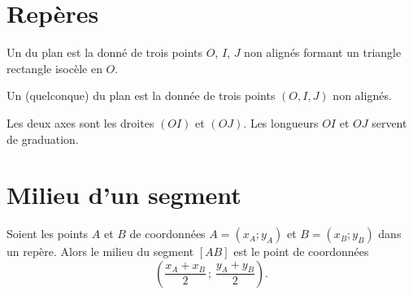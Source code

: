 

\section{Repères}

\begin{definition}
    Un  du plan est la donné de trois points \( O\), \( I\), \( J\) non alignés formant un triangle rectangle isocèle en  \( O\).
\end{definition}

\begin{definition}
    Un  (quelconque) du plan est la donnée de trois points \( (O,I,J)\) non alignés.

    Les deux axes sont les droites \( (OI)\) et \( (OJ)\). Les longueurs \( OI\) et \( OJ\) servent de graduation.
\end{definition}

\section{Milieu d'un segment}

\begin{Aretenir}
    Soient les points \( A\) et \( B\) de coordonnées \( A=(x_A;y_A)\) et \( B=(x_B;y_B)\) dans un repère. Alors le milieu du segment \( [AB]\) est le point de coordonnées
    \begin{equation*}
            \left( \frac{ x_A+x_B }{ 2 }\,;\,\frac{ y_A+y_B }{2} \right).
    \end{equation*}
\end{Aretenir}

\newpage

